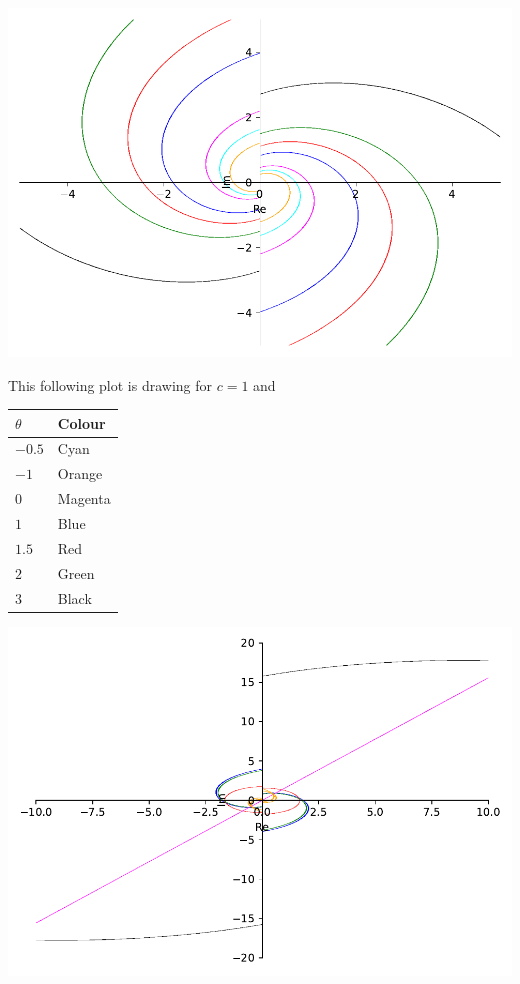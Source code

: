 \documentclass[
]{book}
\theoremstyle{definition}
\theoremstyle{definition}
\theoremstyle{definition}
\theoremstyle{definition}
\theoremstyle{remark}
\begin{document}
\includegraphics{ConformalMapping_files/figure-latex/unnamed-chunk-63-13.pdf}

This following plot is drawing for \(c=1\) and

\begin{longtable}[]{@{}ll@{}}
\toprule\noalign{}
\(\theta\) & Colour \\
\midrule\noalign{}
\endhead
\bottomrule\noalign{}
\endlastfoot
\(-0.5\) & Cyan \\
\(-1\) & Orange \\
\(0\) & Magenta \\
\(1\) & Blue \\
\(1.5\) & Red \\
\(2\) & Green \\
\(3\) & Black \\
\end{longtable}

\includegraphics{ConformalMapping_files/figure-latex/unnamed-chunk-64-15.pdf}
\end{document}
